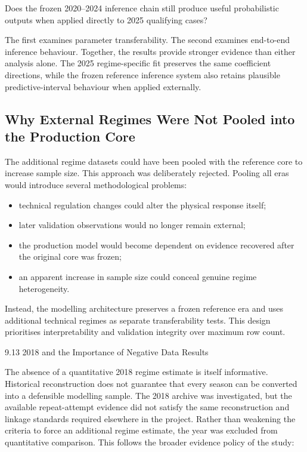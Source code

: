 Does the frozen 2020--2024 inference chain still produce useful probabilistic outputs when applied directly to 2025 qualifying cases?

The first examines parameter transferability. The second examines end-to-end inference behaviour. Together, the results provide stronger evidence than either analysis alone. The 2025 regime-specific fit preserves the same coefficient directions, while the frozen reference inference system also retains plausible predictive-interval behaviour when applied externally.

\subsection{Why External Regimes Were Not Pooled into the Production Core}
The additional regime datasets could have been pooled with the reference core to increase sample size. This approach was deliberately rejected. Pooling all eras would introduce several methodological problems:

\begin{itemize}
\item technical regulation changes could alter the physical response itself;
\item later validation observations would no longer remain external;
\item the production model would become dependent on evidence recovered after the original core was frozen;
\item an apparent increase in sample size could conceal genuine regime heterogeneity.
\end{itemize}

Instead, the modelling architecture preserves a frozen reference era and uses additional technical regimes as separate transferability tests. This design prioritises interpretability and validation integrity over maximum row count.

9.13 2018 and the Importance of Negative Data Results

The absence of a quantitative 2018 regime estimate is itself informative. Historical reconstruction does not guarantee that every season can be converted into a defensible modelling sample. The 2018 archive was investigated, but the available repeat-attempt evidence did not satisfy the same reconstruction and linkage standards required elsewhere in the project. Rather than weakening the criteria to force an additional regime estimate, the year was excluded from quantitative comparison. This follows the broader evidence policy of the study:

